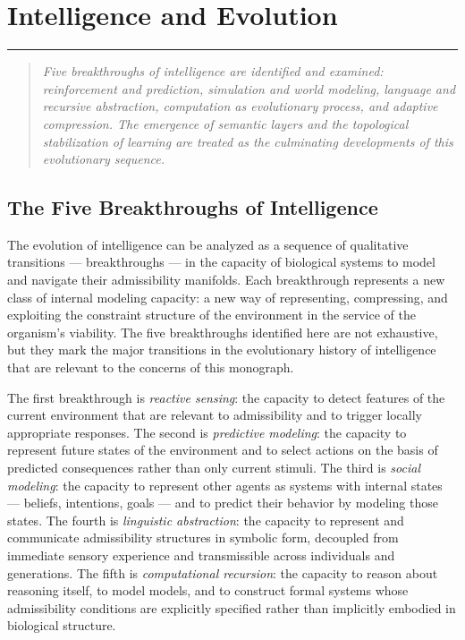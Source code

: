 \documentclass[12pt,openany]{book}
\theoremstyle{plain}
\theoremstyle{definition}
\theoremstyle{remark}
\newcommand{\chapterrule}{%
  \vspace{4pt}%
  {\color{SpherepopBlue}\rule{\textwidth}{0.8pt}}%
  \vspace{10pt}%
}
\newenvironment{chapterprecis}{%
  \begin{quote}\small\itshape}{%
  \end{quote}\medskip}
\begin{document}
\chapter{Intelligence and Evolution}
\chapterrule

\begin{chapterprecis}
Five breakthroughs of intelligence are identified and examined:
reinforcement and prediction, simulation and world modeling,
language and recursive abstraction, computation as evolutionary
process, and adaptive compression. The emergence of semantic
layers and the topological stabilization of learning are treated
as the culminating developments of this evolutionary sequence.
\end{chapterprecis}

\section{The Five Breakthroughs of Intelligence}

The evolution of intelligence can be analyzed as a sequence of qualitative transitions — breakthroughs — in the capacity of biological systems to model and navigate their admissibility manifolds. Each breakthrough represents a new class of internal modeling capacity: a new way of representing, compressing, and exploiting the constraint structure of the environment in the service of the organism's viability. The five breakthroughs identified here are not exhaustive, but they mark the major transitions in the evolutionary history of intelligence that are relevant to the concerns of this monograph.

The first breakthrough is \emph{reactive sensing}: the capacity to detect features of the current environment that are relevant to admissibility and to trigger locally appropriate responses. The second is \emph{predictive modeling}: the capacity to represent future states of the environment and to select actions on the basis of predicted consequences rather than only current stimuli. The third is \emph{social modeling}: the capacity to represent other agents as systems with internal states — beliefs, intentions, goals — and to predict their behavior by modeling those states. The fourth is \emph{linguistic abstraction}: the capacity to represent and communicate admissibility structures in symbolic form, decoupled from immediate sensory experience and transmissible across individuals and generations. The fifth is \emph{computational recursion}: the capacity to reason about reasoning itself, to model models, and to construct formal systems whose admissibility conditions are explicitly specified rather than implicitly embodied in biological structure.
\end{document}
